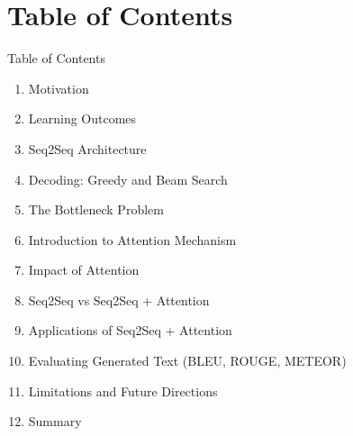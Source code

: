 \section{Table of Contents}
\begin{frame}{Table of Contents}
    \begin{enumerate}
      \item Motivation
      \item Learning Outcomes
      \item Seq2Seq Architecture
      \item Decoding: Greedy and Beam Search
      \item The Bottleneck Problem
      \item Introduction to Attention Mechanism
      \item Impact of Attention
      \item Seq2Seq vs Seq2Seq + Attention
      \item Applications of Seq2Seq + Attention
      \item Evaluating Generated Text (BLEU, ROUGE, METEOR)
      \item Limitations and Future Directions
      \item Summary
    \end{enumerate}
\end{frame}